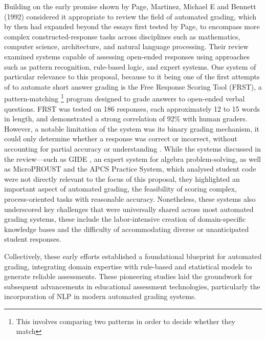 \documentclass[a4paper,10pt]{article}
\begin{document}
Building on the early promise shown by Page, Martinez, Michael E and Bennett (1992) considered it appropriate to review the field of automated grading, which by then had expanded beyond the essays first tested by Page, to encompass more complex constructed-response tasks across disciplines such as mathematics, computer science, architecture, and natural language processing. Their review examined systems capable of assessing open-ended responses using approaches such as pattern recognition, rule-based logic, and expert systems. One system of particular relevance to this proposal, because to it being one of the first attempts of to automate short answer grading is the Free Response Scoring Tool (FRST), a pattern-matching \footnote{This involves comparing two patterns in order to decide whether they match\cite{hak2009pattern}} program designed to grade answers to open-ended verbal questions. FRST was tested on 186 responses, each approximately 12 to 15 words in length, and demonstrated a strong correlation of 92\% with human graders\cite{martinez1992review}. However, a notable limitation of the system was its binary grading mechanism, it could only determine whether a response was correct or incorrect, without accounting for partial accuracy or understanding \cite{martinez1992review}. While the systems discussed in the review—such as GIDE \cite{martinez1992review}, an expert system for algebra problem-solving, as well as MicroPROUST \cite{martinez1992review} and the APCS Practice System\cite{martinez1992review}, which analysed student code were not directly relevant to the focus of this proposal, they highlighted an important aspect of automated grading, the feasibility of scoring complex, process-oriented tasks with reasonable accuracy. Nonetheless, these systems also underscored key challenges that were universally shared across most automated grading systems, these include the labor-intensive creation of domain-specific knowledge bases and the difficulty of accommodating diverse or unanticipated student responses\cite{martinez1992review}.\newline\newline

Collectively, these early efforts established a foundational blueprint for automated grading, integrating domain expertise with rule-based and statistical models to generate reliable assessments. These pioneering studies laid the groundwork for subsequent advancements in educational assessment technologies, particularly the incorporation of NLP in modern automated grading systems.
\end{document}
